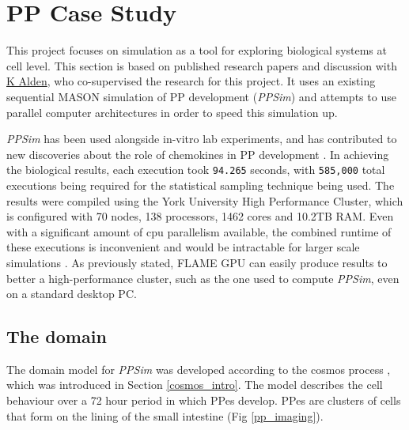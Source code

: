 \documentclass{UoYCSproject}
\begin{document}
\section{\gls{PP} Case Study}
\label{ppsim}
This project focuses on simulation as a tool for exploring biological systems at cell level.
This section is based on published research papers \cite{kieran_thesis, kieran_methodology, kieran_results, kieran_machine_learning, spartan} and discussion with \href{https://www.york.ac.uk/computational-immunology/members/kieran/}{K Alden}, who co-supervised the research for this project.
It uses an existing sequential \gls{MASON} simulation of \gls{PP} development \cite{kieran_thesis, kieran_methodology, spartan} (\textit{PPSim}) and attempts to use parallel computer architectures in order to speed this simulation up.

\textit{PPSim} has been used alongside \gls{in-vitro} lab experiments, and has contributed to new discoveries about the role of chemokines in PP development \cite{ppsim_findings, kieran_results}.
In achieving the biological results, each execution took \texttt{94.265} seconds, with \texttt{585,000} total executions being required for the statistical sampling technique being used.
The results were compiled using the York University High Performance Cluster, which is configured with 70 nodes, 138 processors, 1462 cores and 10.2TB RAM.
Even with a significant amount of \gls{cpu} parallelism available, the combined runtime of these executions is inconvenient and would be intractable for larger scale simulations \cite{kieran_machine_learning}.
As previously stated, \gls{FLAME GPU} can easily produce results to better a high-performance cluster, such as the one used to compute \textit{PPSim}, even on a standard desktop PC.

\subsection{The \gls{domain}}
The domain model for \textit{PPSim} was developed according to the \acrshort{cosmos} process \cite{cosmos}, which was introduced in Section \ref{cosmos_intro}.
The model describes the cell behaviour over a 72 hour period in which \gls{PP}es develop.
\gls{PP}es are clusters of cells that form on the lining of the small intestine (Fig \ref{pp_imaging}).
\end{document}

